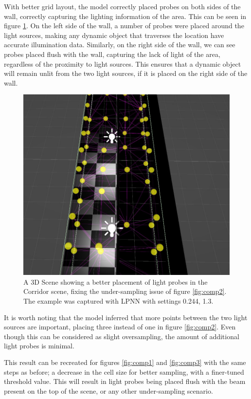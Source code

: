 With better grid layout, the model correctly placed probes on both sides of the wall, correctly capturing the lighting information of the area. This can be seen in figure \ref{fig:corr_1}. On the left side of the wall, a number of probes were placed around the light sources, making any dynamic object that traverses the location have accurate illumination data. Similarly, on the right side of the wall, we can see probes placed flush with the wall, capturing the lack of light of the area, regardless of the proximity to light sources. This ensures that a dynamic object will remain unlit from the two light sources, if it is placed on the right side of the wall. 

\begin{figure}[h]
	\centering
	\includegraphics[scale=0.4]{Graphics/results/corridor_0.244_1.3.jpg}
	\caption{A 3D Scene showing a better placement of light probes in the Corridor scene, fixing the under-sampling issue of figure \ref{fig:comp2}. The example was captured with LPNN with settings 0.244, 1.3.}
	\label{fig:corr_1}
\end{figure}

It is worth noting that the model inferred that more points between the two light sources are important, placing three instead of one in figure \ref{fig:comp2}. Even though this can be considered as slight oversampling, the amount of additional light probes is minimal.

This result can be recreated for figures \ref{fig:comp1} and \ref{fig:comp3} with the same steps as before; a decrease in the cell size for better sampling, with a finer-tuned threshold value. This will result in light probes being placed flush with the beam present on the top of the scene, or any other under-sampling scenario.

